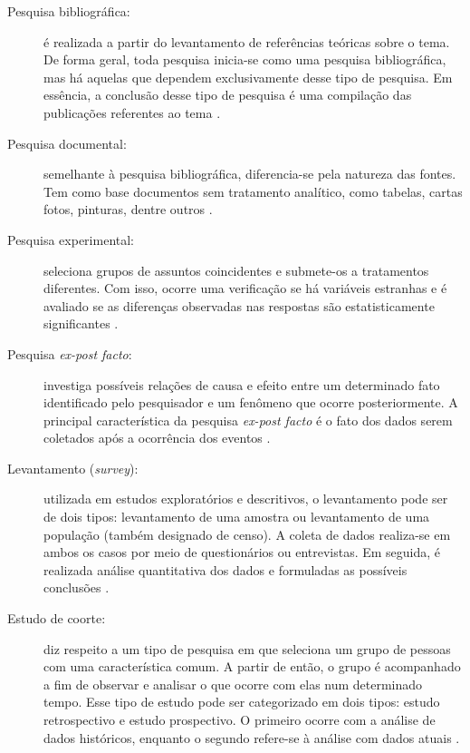 \begin{description}
\item[Pesquisa bibliográfica:] é realizada a partir do levantamento de referências teóricas sobre o tema. De forma geral, toda pesquisa inicia-se como uma pesquisa bibliográfica, mas há aquelas que dependem exclusivamente desse tipo de pesquisa. Em essência, a conclusão desse tipo de pesquisa é uma compilação das publicações referentes ao tema \cite{prodanov2013}.  

\item[Pesquisa documental:] semelhante à pesquisa bibliográfica, diferencia-se pela natureza das fontes. Tem como base documentos sem tratamento analítico, como tabelas, cartas fotos, pinturas, dentre outros \cite{gil2002}. 

\item[Pesquisa experimental:] seleciona grupos de assuntos coincidentes e submete-os a tratamentos diferentes. Com isso, ocorre uma verificação se há variáveis estranhas e é avaliado se as diferenças observadas nas respostas são estatisticamente significantes \cite{tafner2007}.

\item[Pesquisa \textit{ex-post facto}:] investiga possíveis relações de causa e efeito entre um determinado fato identificado pelo pesquisador e um fenômeno que ocorre posteriormente. A principal característica da pesquisa \textit{ex-post facto} é o fato dos dados serem coletados após a ocorrência dos eventos \cite{gil2002}.

\item[Levantamento (\textit{survey}):] utilizada em estudos exploratórios e descritivos, o levantamento pode ser de dois tipos: levantamento de uma amostra ou levantamento de uma população (também designado de censo). A coleta de dados realiza-se em ambos os casos por meio de questionários ou entrevistas. Em seguida, é realizada análise quantitativa dos dados e formuladas as possíveis conclusões \cite{prodanov2013}.

\item[Estudo de coorte:] diz respeito a um tipo de pesquisa em que seleciona um grupo de pessoas com uma característica comum. A partir de então, o grupo é acompanhado a fim de observar e analisar o que ocorre com elas num determinado tempo. Esse tipo de estudo pode ser categorizado em dois tipos: estudo retrospectivo e estudo prospectivo. O primeiro ocorre com a análise de dados históricos, enquanto o segundo refere-se à análise com dados atuais \cite{gil2002}.   


\end{description}
